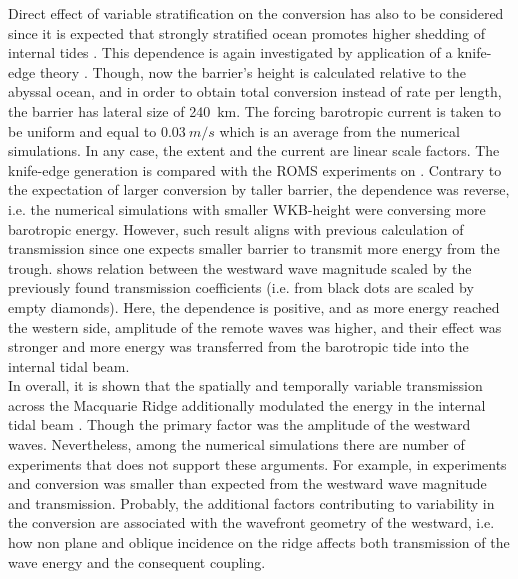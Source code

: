 \documentclass[12pt]{article}
\begin{document}
Direct effect of variable stratification on the conversion has also to be considered since it is 
expected that strongly stratified ocean promotes higher shedding of internal tides 
\citep{holloway1999internal}. This dependence is again investigated by application of a knife-edge 
theory 
\citep{st2003generation}. Though, now the barrier's height is calculated relative to the abyssal 
ocean, and in order to obtain total conversion instead of rate per length, the barrier has lateral 
size of 240~km. The forcing barotropic current is taken to be uniform and equal to $0.03~m/s$ 
which is 
an average from the numerical simulations. In any case, the extent and the current are linear 
 scale factors. The knife-edge generation is compared with the ROMS experiments on  
 . Contrary to the expectation of larger conversion by taller 
 barrier, the dependence was reverse, i.e. the numerical simulations with smaller WKB-height were 
 conversing more barotropic energy. However, such result aligns with previous calculation of 
 transmission since one expects smaller barrier to transmit more energy from the trough. 
  shows 
 relation between the westward wave magnitude scaled by the previously found transmission 
 coefficients (i.e. from  black dots are scaled by empty diamonds). 
 Here, the dependence is positive, and as more energy reached the western side, amplitude of the 
 remote waves was higher, and their effect was stronger and more energy was transferred from the 
 barotropic tide into the internal tidal beam.\\
 
In overall, it is shown that the spatially and temporally variable transmission across the 
Macquarie Ridge additionally modulated the energy in the internal tidal beam 
. Though the primary factor was the amplitude of the 
westward waves. Nevertheless, among the numerical simulations there are number of experiments that 
does not support these arguments. For example, in experiments  and  
conversion was smaller than expected from the westward wave magnitude and transmission. Probably, 
the additional factors contributing to variability in the conversion are associated with the 
wavefront geometry of the westward, i.e. how non plane and oblique incidence on the ridge affects 
both transmission of the wave energy and the consequent coupling.
\end{document}
